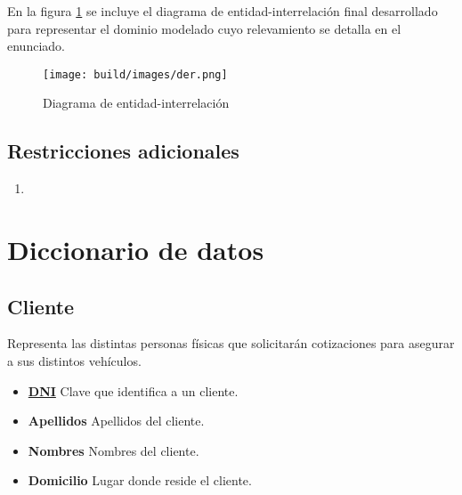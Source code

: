 \documentclass[a4paper,11pt]{article}
\begin{document}
 En la figura \ref{fig:der} se incluye el diagrama de entidad-interrelación
 final desarrollado para representar el dominio modelado cuyo relevamiento se
 detalla en el enunciado.

\begin{figure}[h!t]
  \centering
  \texttt{[image: build/images/der.png]}
  \caption{Diagrama de entidad-interrelación} \label{fig:der}
\end{figure}

\FloatBarrier


\subsection{Restricciones adicionales}


\begin{enumerate}

  \item 
  
\end{enumerate}

\section{Diccionario de datos}

\subsection{Cliente}

Representa las distintas personas físicas que solicitarán cotizaciones para asegurar 
a sus distintos vehículos.

\begin{itemize}

  \item \textbf{\uline{DNI}} Clave que identifica a un cliente.
  
  \item \textbf{Apellidos} Apellidos del cliente.

  \item \textbf{Nombres} Nombres del cliente.
  
  \item \textbf{Domicilio} Lugar donde reside el cliente.
  
\end{itemize}
\end{document}
